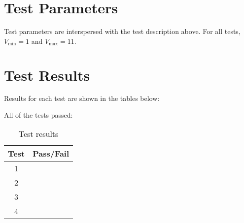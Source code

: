 \section{Test Parameters}
Test parameters are interspersed with the test description above. For all tests, $V_{\mathrm{min}} = 1$ and $V_{\mathrm{max}} = 11$.

\section{Test Results}
Results for each test are shown in the tables below:





All of the tests passed:
\begin{table}[H]
	\caption{Test results}
	\label{tab:results}
	\centering \fontsize{10}{10}\selectfont
	\begin{tabular}{c | c  } %
		\hline
		\textbf{Test} 						  		&\textbf{Pass/Fail} \\ \hline
	   1	   			&  \\ \hline
		2	   			&  \\ \hline
		3	   			&  \\ \hline
		4	   			&  \\ \hline
	\end{tabular}
\end{table}





\pagebreak %